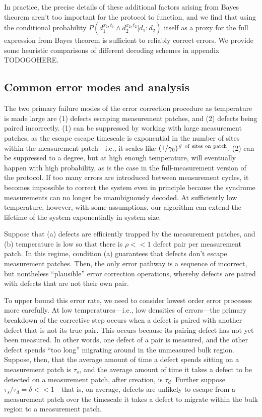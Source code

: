 \documentclass[twocolumn,superscriptaddress,aps,prb,floatfix]{revtex4-1}
\begin{document}
In practice, the precise details of these additional factors arising from Bayes theorem aren't too important for the protocol to function, and we find that using the conditional probability $P(d_1^{x_1,t_1} \wedge d_2^{x_2,t_2} | d_1:d_2)$ itself as a proxy for the full expression from Bayes theorem is sufficient to reliably correct errors.  We provide some heuristic comparisons of different decoding schemes in appendix TODOGOHERE.
 
 
 \subsection{Common error modes and analysis}
 \label{sec:threshold}
 
 The two primary failure modes of the error correction procedure as temperature is made large are (1) defects escaping measurement patches, and (2) defects being paired incorrectly.  (1) can be suppressed by working with large measurement patches, as the escape escape timescale is exponential in the number of sites within the measurement patch---i.e., it scales like $(1/\gamma_0)^{\rm{\#\ of\ sites\ on\ patch}}$.  (2) can be suppressed to a degree, but at high enough temperature, will eventually happen with high probability, as is the case in the full-measurement version of the protocol.  If too many errors are introduced between measurement cycles, it becomes impossible to correct the system even in principle because the syndrome measurements can no longer be unambiguously decoded.  At sufficiently low temperature, however, with some assumptions, our algorithm can extend the lifetime of the system exponentially in system size.
 
 Suppose that (a) defects are efficiently trapped by the measurement patches, and (b) temperature is low so that there is $\rho<<1$ defect pair per measurement patch.  In this regime, condition (a) guarantees that defects don't escape measurement patches.  Then, the only error pathway is a sequence of incorrect, but nontheless ``plausible'' error correction operations, whereby defects are paired with defects that are not their own pair.  
 
 To upper bound this error rate, we need to consider lowest order error processes more carefully.  At low temperatures---i.e., low densities of errors---the primary breakdown of the corrective step occurs when a defect is paired with another defect that is not its true pair.  This occurs because its pairing defect has not yet been measured.  In other words, one defect of a pair is measured, and the other defect spends ``too long'' migrating around in the unmeasured bulk region.  Suppose, then, that the average amount of time a defect spends sitting on a measurement patch is $\tau_s$, and the average amount of time it takes a defect to be detected on a measurement patch, after creation, is $\tau_d$.  Further suppose $\tau_s/\tau_d = \delta << 1$---that is, on average, defects are unlikely to escape from a measurement patch over the timescale it takes a defect to migrate within the bulk region to a measurement patch.
 
\end{document}
